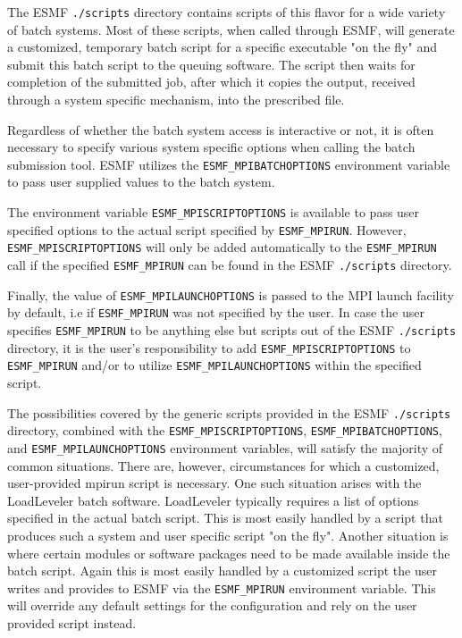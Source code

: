 The ESMF {\tt ./scripts} directory contains scripts of this flavor for a wide
variety of batch systems. Most of these scripts, when called through ESMF,
will generate a customized, temporary batch script for a specific executable
"on the fly" and submit this batch script to the queuing software. The script
then waits for completion of the submitted job, after which it copies the
output, received through a system specific mechanism, into the prescribed file.

Regardless of whether the batch system access is interactive or not, it is
often necessary to specify various system specific options when calling the
batch submission tool. ESMF utilizes the {\tt ESMF\_MPIBATCHOPTIONS} environment
variable to pass user supplied values to the batch system.

The environment variable {\tt ESMF\_MPISCRIPTOPTIONS} is available to pass
user specified options to the actual script specified by {\tt ESMF\_MPIRUN}.
However, {\tt ESMF\_MPISCRIPTOPTIONS} will only be added automatically to the 
{\tt ESMF\_MPIRUN} call if the specified {\tt ESMF\_MPIRUN} can be found in the
ESMF {\tt ./scripts} directory.

Finally, the value of {\tt ESMF\_MPILAUNCHOPTIONS} is passed to the MPI launch
facility by default, i.e if {\tt ESMF\_MPIRUN} was not specified by the user.
In case the user specifies {\tt ESMF\_MPIRUN} to be anything else but scripts
out of the ESMF {\tt ./scripts} directory, it is the user's responsibility to
add {\tt ESMF\_MPISCRIPTOPTIONS} to {\tt ESMF\_MPIRUN} and/or to utilize
{\tt ESMF\_MPILAUNCHOPTIONS} within the specified script.

The possibilities covered by the generic scripts provided in the ESMF
{\tt ./scripts} directory, combined with the {\tt ESMF\_MPISCRIPTOPTIONS},
{\tt ESMF\_MPIBATCHOPTIONS}, and {\tt ESMF\_MPILAUNCHOPTIONS} environment
variables, will satisfy the majority of common situations. There are, however,
circumstances for which a customized, user-provided mpirun script is necessary.
One such situation arises with the LoadLeveler batch software. LoadLeveler
typically requires a list of options specified in the actual batch script. This
is most easily handled by a script that produces such a system and user specific
script "on the fly". Another situation is where certain modules or software
packages need to be made available inside the batch script. Again this is most
easily handled by a customized script the user writes and provides to ESMF via
the {\tt ESMF\_MPIRUN} environment variable. This will override any default
settings for the configuration and rely on the user provided script instead.

